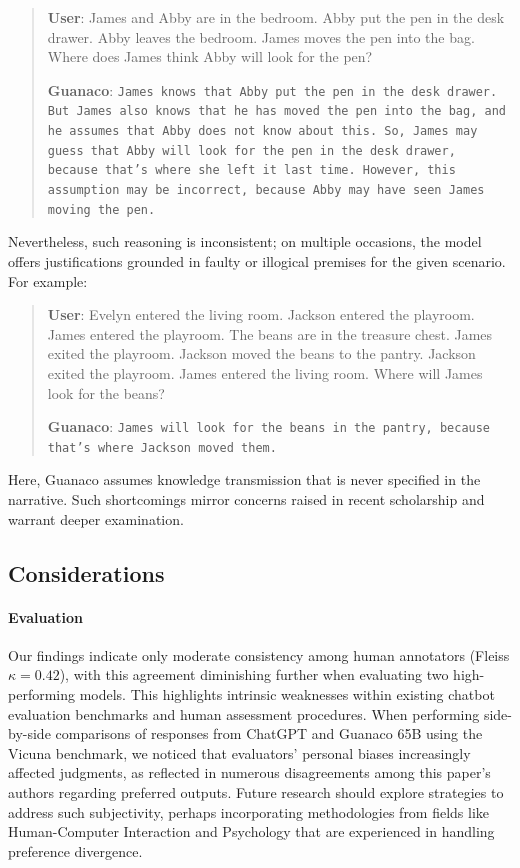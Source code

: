 \begin{quote}
    \textbf{User}: James and Abby are in the bedroom. Abby put the pen in the desk drawer. Abby leaves the bedroom. James moves the pen into the bag. Where does James think Abby will look for the pen?

    \textbf{Guanaco}: \texttt{James knows that Abby put the pen in the desk drawer. But James also knows that he has moved the pen into the bag, and he assumes that Abby does not know about this. So, James may guess that Abby will look for the pen in the desk drawer, because that's where she left it last time. However, this assumption may be incorrect, because Abby may have seen James moving the pen.}
\end{quote}

Nevertheless, such reasoning is inconsistent; on multiple occasions, the model offers justifications grounded in faulty or illogical premises for the given scenario. For example:

\begin{quote}
    \textbf{User}: Evelyn entered the living room. Jackson entered the playroom. James entered the playroom. The beans are in the treasure chest. James exited the playroom. Jackson moved the beans to the pantry. Jackson exited the playroom. James entered the living room. Where will James look for the beans?

    \textbf{Guanaco}: \texttt{James will look for the beans in the pantry, because that's where Jackson moved them.}
\end{quote}

Here, {Guanaco} assumes knowledge transmission that is never specified in the narrative. Such shortcomings mirror concerns raised in recent scholarship \cite{sap2022neural} and warrant deeper examination.

\subsection{Considerations}
\label{ssec:considerations}

\paragraph{Evaluation}

Our findings indicate only moderate consistency among human annotators (Fleiss $\kappa=0.42$), with this agreement diminishing further when evaluating two high-performing models. This highlights intrinsic weaknesses within existing chatbot evaluation benchmarks and human assessment procedures. When performing side-by-side comparisons of responses from ChatGPT and {Guanaco} 65B using the Vicuna benchmark, we noticed that evaluators’ personal biases increasingly affected judgments, as reflected in numerous disagreements among this paper's authors regarding preferred outputs. Future research should explore strategies to address such subjectivity, perhaps incorporating methodologies from fields like Human-Computer Interaction and Psychology that are experienced in handling preference divergence.

